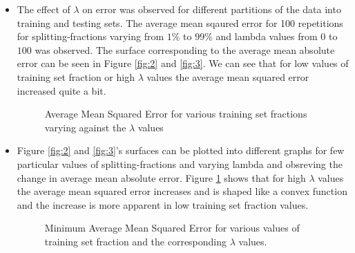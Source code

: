 \documentclass{article}
\begin{document}
\begin{itemize}
\item The effect of $\lambda$ on error was observed for different partitions of the data into training and testing sets. The average mean sqaured error for 100 repetitions for splitting-fractions varying from $1\%$ to $99\%$ and lambda values from $0$ to $100$ was observed. The surface corresponding to the average mean absolute error can be seen in Figure \ref{fig:2} and \ref{fig:3}. We can see that for low values of training set fraction or high $\lambda$ values the average mean squared error increased quite a bit.
 
 \begin{figure}[H]
 \caption{Average Mean Squared Error for various training set fractions varying against the $\lambda$ values}
 \label{fig:4}
 \end{figure}
 
\item Figure \ref{fig:2} and \ref{fig:3}'s surfaces can be plotted into different graphs for few particular values of splitting-fractions and varying lambda and obsreving the change in average mean absolute error. Figure \ref{fig:4} shows that for high $\lambda$ values the average mean squared error increases and is shaped like a convex function and the increase is more apparent in low training set fraction values.

\begin{figure}[H]
 \caption{Minimum Average Mean Squared Error for various values of training set fraction and the corresponding $\lambda$ values.}
 \label{fig:5}
 \end{figure}


\end{itemize}
\end{document}
